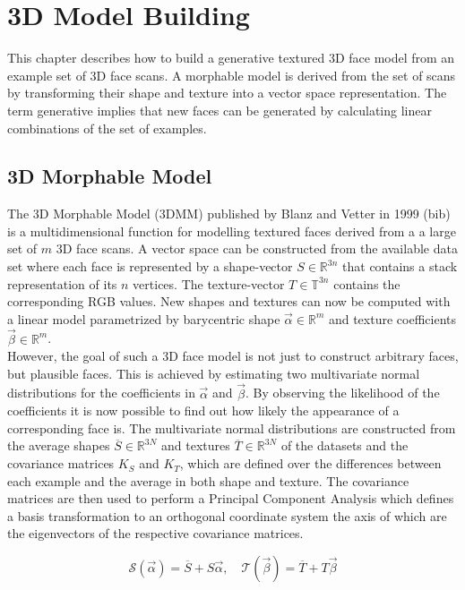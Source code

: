 \chapter{3D Model Building}
This chapter describes how to build a generative textured 3D face model from an example set of 3D face scans. A morphable model is derived from the set of scans by transforming their shape and texture into a vector space representation. The term generative implies that new faces can be generated by calculating linear combinations of the set of examples. 

\section{3D Morphable Model}
The 3D Morphable Model (3DMM) published by Blanz and Vetter in 1999 (bib) is a multidimensional function for modelling textured faces derived from a a large set of $m$ 3D face scans. A vector space can be constructed from the available data set where each face is represented by a shape-vector $S \in \mathbb{R}^{3n}$ that contains a stack representation of its $n$ vertices. The texture-vector $T \in \mathbb{T}^{3n}$ contains the corresponding RGB values. New shapes and textures can now be computed
with a linear model parametrized by barycentric shape $\vec\alpha \in \mathbb{R}^{m}$ and texture coefficients $\vec\beta \in \mathbb{R}^{m}$.\\
However, the goal of such a 3D face model is not just to construct arbitrary faces, but plausible faces. This is achieved by estimating two multivariate normal distributions for the coefficients in $\vec\alpha$ and $\vec\beta$.
By observing the likelihood of the coefficients it is now possible to find out how likely the appearance of a corresponding face is.
The multivariate normal distributions are constructed from the average shapes $\overline{S} \in \mathbb{R}^{3N}$ and textures $\overline{T} \in \mathbb{R}^{3N}$ of the datasets and the covariance matrices $K_{S}$ and $K_{T}$, which are defined over the differences between each example and the average in both shape and texture.
The covariance matrices are then used to perform a Principal Component Analysis which defines a basis transformation to an orthogonal coordinate system the axis of which are the eigenvectors of the respective covariance matrices.

\begin{equation}
\label{eq:MM}
\mathcal{S}(\vec\alpha)=\overline{S}+S\vec\alpha, \quad \mathcal{T}(\vec\beta)=\overline{T}+T\vec\beta
\end{equation}

